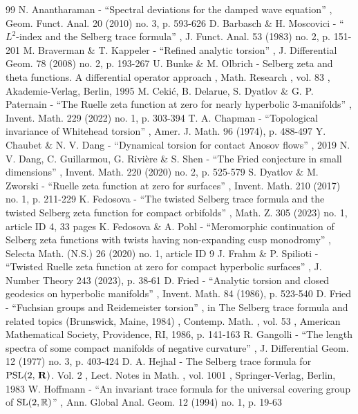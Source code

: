 \documentclass[10pt]{amsart}
\theoremstyle{plain}
\theoremstyle{definition}
\theoremstyle{remark}
\numberwithin{equation}{section}
\begin{document}
\begin{thebibliography}{99}
 N. Anantharaman - “Spectral deviations for the damped wave equation” , Geom. Funct. Anal. 20 (2010) no. 3, p. 593-626
 D. Barbasch \& H. Moscovici - “$L^{2}$-index and the Selberg trace formula” , J. Funct. Anal. 53 (1983) no. 2, p. 151-201
 M. Braverman \& T. Kappeler - “Refined analytic torsion” , J. Differential Geom. 78 (2008) no. 2, p. 193-267
 U. Bunke \& M. Olbrich - Selberg zeta and theta functions. A differential operator approach , Math. Research , vol. 83 , Akademie-Verlag, Berlin, 1995
 M. Cekić, B. Delarue, S. Dyatlov \& G. P. Paternain - “The Ruelle zeta function at zero for nearly hyperbolic 3-manifolds” , Invent. Math. 229 (2022) no. 1, p. 303-394
 T. A. Chapman - “Topological invariance of Whitehead torsion” , Amer. J. Math. 96 (1974), p. 488-497
 Y. Chaubet \& N. V. Dang - “Dynamical torsion for contact Anosov flows” , 2019
 N. V. Dang, C. Guillarmou, G. Rivière \& S. Shen - “The Fried conjecture in small dimensions” , Invent. Math. 220 (2020) no. 2, p. 525-579
 S. Dyatlov \& M. Zworski - “Ruelle zeta function at zero for surfaces” , Invent. Math. 210 (2017) no. 1, p. 211-229
 K. Fedosova - “The twisted Selberg trace formula and the twisted Selberg zeta function for compact orbifolds” , Math. Z. 305 (2023) no. 1, article ID 4, 33 pages
 K. Fedosova \& A. Pohl - “Meromorphic continuation of Selberg zeta functions with twists having non-expanding cusp monodromy” , Selecta Math. (N.S.) 26 (2020) no. 1, article ID 9
 J. Frahm \& P. Spilioti - “Twisted Ruelle zeta function at zero for compact hyperbolic surfaces” , J. Number Theory 243 (2023), p. 38-61
 D. Fried - “Analytic torsion and closed geodesics on hyperbolic manifolds” , Invent. Math. 84 (1986), p. 523-540
 D. Fried - “Fuchsian groups and Reidemeister torsion” , in The Selberg trace formula and related topics (Brunswick, Maine, 1984) , Contemp. Math. , vol. 53 , American Mathematical Society, Providence, RI, 1986, p. 141-163
 R. Gangolli - “The length spectra of some compact manifolds of negative curvature” , J. Differential Geom. 12 (1977) no. 3, p. 403-424
 D. A. Hejhal - The Selberg trace formula for ${\rm PSL}(2,\,{\bf R})$. Vol. 2 , Lect. Notes in Math. , vol. 1001 , Springer-Verlag, Berlin, 1983
 W. Hoffmann - “An invariant trace formula for the universal covering group of ${\rm SL}(2,\mathbb{R})$” , Ann. Global Anal. Geom. 12 (1994) no. 1, p. 19-63

\end{thebibliography}
\end{document}
